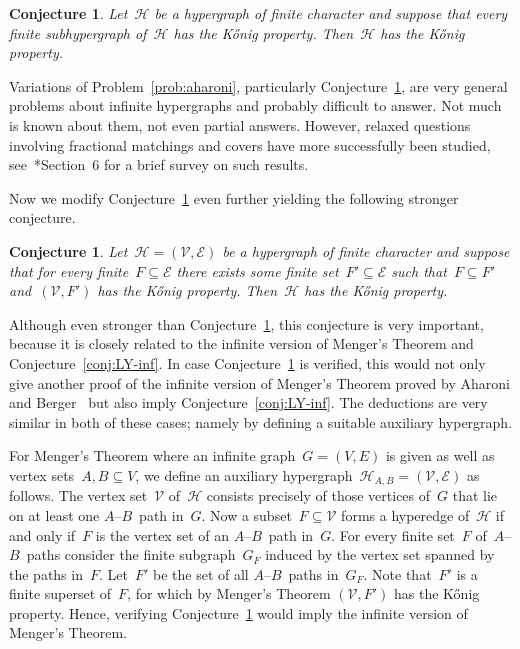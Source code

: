 \documentclass[reqno, 12pt]{amsart}
\numberwithin{equation}{section}
\numberwithin{figure}{section}
\theoremstyle{plain}
\newtheorem{conjecture}[thm]{Conjecture}
\theoremstyle{definition}
\begin{document}
\begin{conjecture}
    \label{conj:aharoni_fin_char}
    Let~$\mathcal{H}$ be a hypergraph of finite character and suppose that every finite subhypergraph of~$\mathcal{H}$ has the K\H{o}nig property.
    Then~$\mathcal{H}$ has the K\H{o}nig property.
\end{conjecture}


Variations of Problem~\ref{prob:aharoni}, particularly Conjecture~\ref{conj:aharoni_fin_char}, are very general problems about infinite hypergraphs and probably difficult to answer.
Not much is known about them, not even partial answers.
However, relaxed questions involving fractional matchings and covers have more successfully been studied, see~\cite{aharoni-conj}*{Section~6} for a brief survey on such results.

Now we modify Conjecture~\ref{conj:aharoni_fin_char} even further yielding the following stronger conjecture.

\begin{conjecture}
    \label{conj:aharoni_compact}
    Let~$\mathcal{H} = (\mathcal{V}, \mathcal{E})$ be a hypergraph of finite character and suppose that for every finite~$F \subseteq \mathcal{E}$ there exists some finite set~$F' \subseteq \mathcal{E}$ such that~$F \subseteq F'$ and~$(\mathcal{V}, F')$ has the K\H{o}nig property.
    Then~$\mathcal{H}$ has the K\H{o}nig property.
\end{conjecture}


Although even stronger than Conjecture~\ref{conj:aharoni_fin_char}, this conjecture is very important, because it is closely related to the infinite version of Menger's Theorem and Conjecture~\ref{conj:LY-inf}.
In case Conjecture~\ref{conj:aharoni_compact} is verified, this would not only give another proof of the infinite version of Menger's Theorem proved by Aharoni and Berger~\cite{inf-menger} but also imply Conjecture~\ref{conj:LY-inf}.
The deductions are very similar in both of these cases; namely by defining a suitable auxiliary hypergraph.

For Menger's Theorem where an infinite graph~${G = (V, E)}$ is given as well as vertex sets~${A, B \subseteq V}$, we define an auxiliary hypergraph~${\mathcal{H}_{A, B} = (\mathcal{V}, \mathcal{E})}$ as follows.
The vertex set~$\mathcal{V}$ of~$\mathcal{H}$ consists precisely of those vertices of~$G$ that lie on at least one $A$--$B$~path in~$G$.
Now a subset~${F \subseteq \mathcal{V}}$ forms a hyperedge of~$\mathcal{H}$ if and only if~$F$ is the vertex set of an $A$--$B$~path in~$G$. 
For every finite set~$F$ of~$A$--$B$~paths consider the finite subgraph~$G_F$ induced by the vertex set spanned by the paths in~$F$.
Let~$F'$ be the set of all $A$--$B$~paths in~$G_F$.
Note that~$F'$ is a finite superset of~$F$, for which by Menger's Theorem ${(\mathcal{V}, F')}$ has the K\H{o}nig property. 
Hence, verifying Conjecture~\ref{conj:aharoni_compact} would imply the infinite version of Menger's Theorem.
\end{document}
